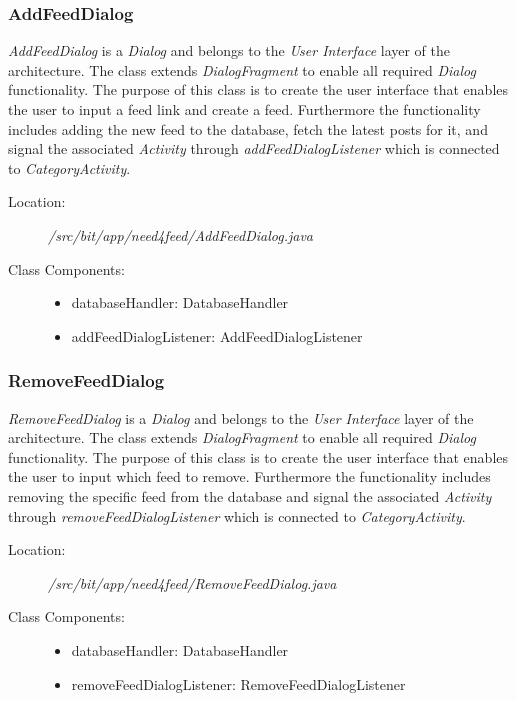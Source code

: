 \subsubsection{AddFeedDialog}
\textit{AddFeedDialog} is a \textit{Dialog} and belongs to the \textit{User Interface} layer of the architecture. The class extends \textit{DialogFragment} to enable all required \textit{Dialog} functionality. The purpose of this class is to create the user interface that enables the user to input a feed link and create a feed. Furthermore the functionality includes adding the new feed to the database, fetch the latest posts for it, and signal the associated \textit{Activity} through \textit{addFeedDialogListener} which is connected to \textit{CategoryActivity}.
\begin{description}
  \item[Location:] \textit{/src/bit/app/need4feed/AddFeedDialog.java} \hfill
  \item[Class Components:] \hfill
     \begin{itemize}
        \item databaseHandler: DatabaseHandler
        \item addFeedDialogListener: AddFeedDialogListener
     \end{itemize}
\end{description}


\subsubsection{RemoveFeedDialog}
\textit{RemoveFeedDialog} is a \textit{Dialog} and belongs to the \textit{User Interface} layer of the architecture. The class extends \textit{DialogFragment} to enable all required \textit{Dialog} functionality. The purpose of this class is to create the user interface that enables the user to input which feed to remove. Furthermore the functionality includes removing the specific feed from the database and signal the associated \textit{Activity} through \textit{removeFeedDialogListener} which is connected to \textit{CategoryActivity}.
\begin{description}
  \item[Location:] \textit{/src/bit/app/need4feed/RemoveFeedDialog.java} \hfill
  \item[Class Components:] \hfill
     \begin{itemize}
        \item databaseHandler: DatabaseHandler
        \item removeFeedDialogListener: RemoveFeedDialogListener
     \end{itemize}
\end{description}



